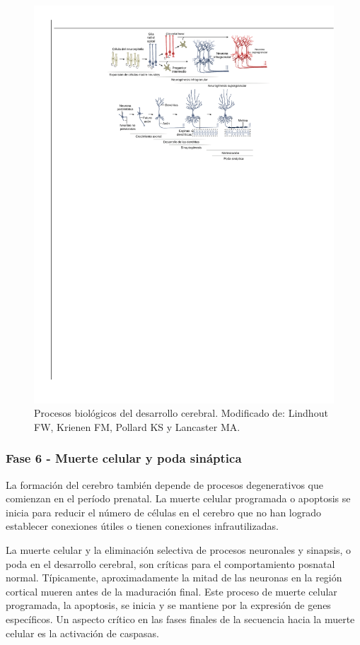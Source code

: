 \documentclass[11pt,letterpaper]{report}
\begin{document}
\begin{figure}[h]
    \centering
    \includegraphics[width=1\textwidth]{embriologiacerebral}
    \caption{Procesos biológicos del desarrollo cerebral. Modificado de:
	Lindhout FW, Krienen FM, Pollard KS y Lancaster MA. \cite{Lindhout2024}}
    \label{fig:embriologiacerebral}
\end{figure}

\subsubsection{Fase 6 - Muerte celular y poda sináptica}
La formación del cerebro también depende de procesos degenerativos que
comienzan en el período prenatal. La muerte celular programada o apoptosis se
inicia para reducir el número de células en el cerebro que no han logrado
establecer conexiones útiles o tienen conexiones infrautilizadas.
\cite{Gibb2018}

La muerte celular y la eliminación selectiva de procesos neuronales y sinapsis,
o poda en el desarrollo cerebral, son críticas para el comportamiento posnatal
normal. Típicamente, aproximadamente la mitad de las neuronas en la región
cortical mueren antes de la maduración final. Este proceso de muerte celular
programada, la apoptosis, se inicia y se mantiene por la expresión de genes
específicos. Un aspecto crítico en las fases finales de la secuencia hacia la
muerte celular es la activación de caspasas. \cite{Polin124}
\end{document}
